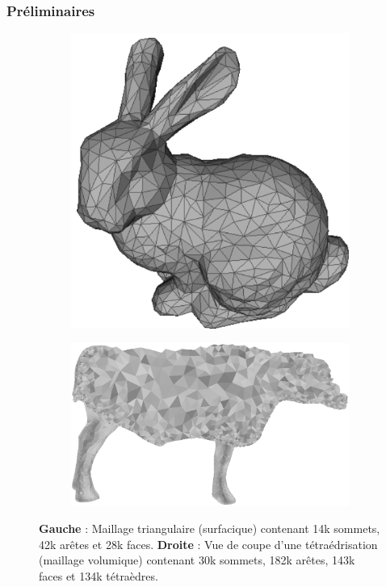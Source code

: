 \documentclass[9pt]{beamer}
\begin{document}
\begin{frame}
\small
\frametitle{Préliminaires}
\begin{figure}[H]
\centering
\begin{subfigure}{.5\textwidth}
  \centering
  \includegraphics[scale=0.10]{Images/bunny}
  \caption{}
\end{subfigure}%
\begin{subfigure}{.5\textwidth}
  \centering
  \includegraphics[scale=0.07]{Images/cow_cut}
  \caption{}
\end{subfigure}
\caption{\textbf{Gauche} : Maillage triangulaire (surfacique) contenant 14k sommets, 42k arêtes et 28k faces. \textbf{Droite} : Vue de coupe d'une tétraédrisation (maillage volumique) contenant 30k sommets, 182k arêtes, 143k faces et 134k tétraèdres.}

\end{figure}
\end{frame}
\end{document}
